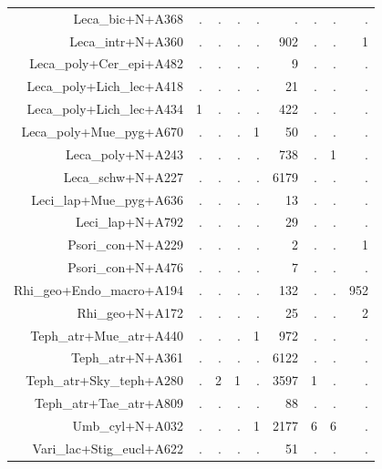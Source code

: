 \documentclass[a4paper, 11]{article}\usepackage[]{graphicx}\usepackage[]{color}
\begin{document}
\begin{table}
\begin{tabular}{rrrrrrrrr}
  Leca\_bic+N+A368 & . & . & . & . & . & . & . & . \\ 
  Leca\_intr+N+A360 & . & . & . & . & 902 & . & . & 1 \\ 
  Leca\_poly+Cer\_epi+A482 & . & . & . & . & 9 & . & . & . \\ 
  Leca\_poly+Lich\_lec+A418 & . & . & . & . & 21 & . & . & . \\ 
  Leca\_poly+Lich\_lec+A434 & 1 & . & . & . & 422 & . & . & . \\ 
  Leca\_poly+Mue\_pyg+A670 & . & . & . & 1 & 50 & . & . & . \\ 
  Leca\_poly+N+A243 & . & . & . & . & 738 & . & 1 & . \\ 
  Leca\_schw+N+A227 & . & . & . & . & 6179 & . & . & . \\ 
  Leci\_lap+Mue\_pyg+A636 & . & . & . & . & 13 & . & . & . \\ 
  Leci\_lap+N+A792 & . & . & . & . & 29 & . & . & . \\ 
  Psori\_con+N+A229 & . & . & . & . & 2 & . & . & 1 \\ 
  Psori\_con+N+A476 & . & . & . & . & 7 & . & . & . \\ 
  Rhi\_geo+Endo\_macro+A194 & . & . & . & . & 132 & . & . & 952 \\ 
  Rhi\_geo+N+A172 & . & . & . & . & 25 & . & . & 2 \\ 
  Teph\_atr+Mue\_atr+A440 & . & . & . & 1 & 972 & . & . & . \\ 
  Teph\_atr+N+A361 & . & . & . & . & 6122 & . & . & . \\ 
  Teph\_atr+Sky\_teph+A280 & . & 2 & 1 & . & 3597 & 1 & . & . \\ 
  Teph\_atr+Tae\_atr+A809 & . & . & . & . & 88 & . & . & . \\ 
  Umb\_cyl+N+A032 & . & . & . & 1 & 2177 & 6 & 6 & . \\ 
  Vari\_lac+Stig\_eucl+A622 & . & . & . & . & 51 & . & . & . \\ 
   \hline
\end{tabular}
\end{table}
\end{document}
